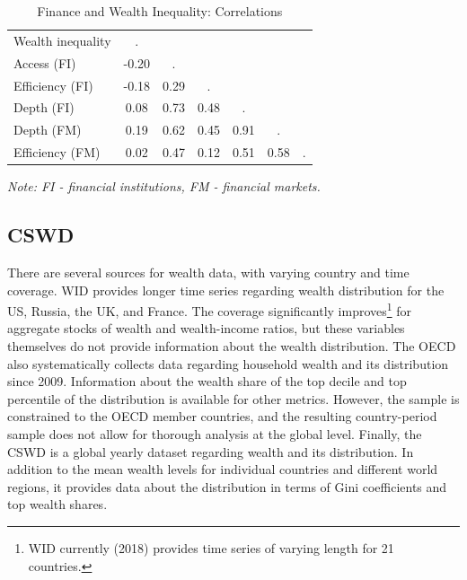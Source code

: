 \begin{refsection}
%
%
\begin{table}[ht!]
\small
\centering
\caption{Finance and Wealth Inequality: Correlations}
\label{ch3tab:corrmat}
\begin{threeparttable}
\begin{tabular}{lcccccc}
  \toprule
  Wealth inequality & . &  & & & & \\
  Access (FI)  & -0.20 & . &  & & &    \\ 
  Efficiency (FI) & -0.18 & 0.29 & . & & &  \\ 
  Depth (FI)  & 0.08 & 0.73 & 0.48 & . &  &   \\ 
  Depth (FM)  & 0.19 & 0.62 & 0.45 & 0.91 & . &   \\ 
  Efficiency (FM)  & 0.02 & 0.47 & 0.12 & 0.51 & 0.58 & .   \\ 
  \bottomrule
\end{tabular}
\begin{tablenotes}
\footnotesize
\item \textit{Note: FI - financial institutions, FM - financial markets.}
\end{tablenotes}
\end{threeparttable}
\end{table}
%
%

\subsection{\ac{CSWD}}\label{ch3subsec:cswd}
There are several sources for wealth data, with varying country and time coverage. \ac{WID} provides longer time series regarding wealth distribution for the \ac{US}, Russia, the \ac{UK}, and France. The coverage significantly improves\footnote{\ac{WID} currently (2018) provides time series of varying length for 21 countries.} for aggregate stocks of wealth and wealth-income ratios, but these variables themselves do not provide information about the wealth distribution. The \ac{OECD} also systematically collects data regarding household wealth and its distribution since 2009. Information about the wealth share of the top decile and top percentile of the distribution is available for other metrics. However, the sample is constrained to the \ac{OECD} member countries, and the resulting country-period sample does not allow for thorough analysis at the global level. Finally, the \ac{CSWD} is a global yearly dataset regarding wealth and its distribution. In addition to the mean wealth levels for individual countries and different world regions, it provides data about the distribution in terms of Gini coefficients and top wealth shares.


\end{refsection}
